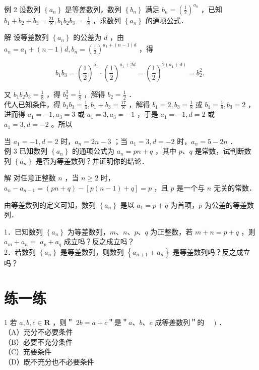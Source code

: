 \documentclass[10pt]{article}
\begin{document}
例 2 设数列 \(\left\{a_{n}\right\}\) 是等差数列，数列 \(\left\{b_{n}\right\}\) 满足 \(b_{n}=\left(\frac{1}{2}\right)^{a_{n}}\) ，已知 \(b_{1}+b_{2}+b_{3}=\frac{21}{8}, b_{1} b_{2} b_{3}=\) \(\frac{1}{8}\) ，求数列 \(\left\{a_{n}\right\}\) 的通项公式．

解 设等差数列 \(\left\{a_{n}\right\}\) 的公差为 \(d\) ，由 \(a_{n}=a_{1}+(n-1) d, b_{n}=\left(\frac{1}{2}\right)^{a_{1}+(n-1) d}\) ，得

\[
b_{1} b_{3}=\left(\frac{1}{2}\right)^{a_{1}} \cdot\left(\frac{1}{2}\right)^{a_{1}+2 d}=\left(\frac{1}{2}\right)^{2\left(a_{1}+d\right)}=b_{2}^{2} \text {. }
\]

又 \(b_{1} b_{2} b_{3}=\frac{1}{8}\) ，得 \(b_{2}^{3}=\frac{1}{8}\) ，解得 \(b_{2}=\frac{1}{2}\) ．\\
代人已知条件，得 \(b_{1} b_{3}=\frac{1}{4}, b_{1}+b_{3}=\frac{17}{8}\) ，解得 \(b_{1}=2, b_{3}=\frac{1}{8}\) 或 \(b_{1}=\frac{1}{8}, b_{3}=2\) ，进而得 \(a_{1}=-1, a_{3}=3\) 或 \(a_{1}=3, a_{3}=-1\) ，于是 \(a_{1}=-1, d=2\) 或 \(a_{1}=3, d=-2\) 。所以

当 \(a_{1}=-1, d=2\) 时，\(a_{n}=2 n-3\) ；当 \(a_{1}=3, d=-2\) 时，\(a_{n}=5-2 n\) ．\\
例 3 已知数列 \(\left\{a_{n}\right\}\) 的通项公式为 \(a_{n}=p n+q\) ，其中 \(p 、 q\) 是常数，试判断数列 \(\left\{a_{n}\right\}\) 是否为等差数列？并证明你的结论．

解 对任意正整数 \(n\) ，当 \(n \geqslant 2\) 时，\(a_{n}-a_{n-1}=(p n+q)-[p(n-1)+q]=p\) ，且 \(p\) 是一个与 \(n\) 无关的常数．

由等差数列的定义可知，数列 \(\left\{a_{n}\right\}\) 是以 \(a_{1}=p+q\) 为首项，\(p\) 为公差的等差数列．

1．已知数列 \(\left\{a_{n}\right\}\) 为等差数列，\(m 、 n 、 p 、 q\) 为正整数，若 \(m+n=p+q\) ，则 \(a_{m}+a_{n}=\) \(a_{p}+a_{q}\) 成立吗？反之成立吗？\\
2．若数列 \(\left\{a_{n}\right\}\) 是等差数列，则数列 \(\left\{a_{n+1}+a_{n}\right\}\) 是等差数列吗？反之成立吗？

\section*{练一练}
1 若 \(a, b, c \in \mathbf{R}\) ，则＂ \(2 b=a+c\)＂是＂\(a 、 b 、 c\) 成等差数列＂的 \(\quad)\) ．\\
（A）充分不必要条件\\
（B）必要不充分条件\\
（C）充要条件\\
（D）既不充分也不必要条件
\end{document}
